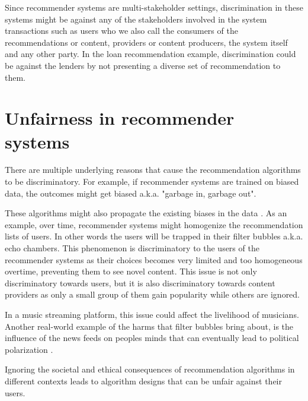 Since recommender systems are multi-stakeholder settings, discrimination in these systems might be against any of the stakeholders involved in the system transactions such as users who we also call the consumers of the recommendations or content, providers or content producers, the system itself and any other party. In the loan recommendation example, discrimination could be against the lenders by not presenting a diverse set of recommendation to them.


\section{Unfairness in recommender systems}

There are multiple underlying reasons that cause the recommendation algorithms to be discriminatory. For example, if recommender systems are trained on biased data, the outcomes might get biased a.k.a. "garbage in, garbage out". 

These algorithms might also propagate the existing biases in the data \cite{barocas2016big}. As an example, over time, recommender systems might homogenize the recommendation lists of users. In other words the users will be trapped in their filter bubbles a.k.a. echo chambers. This phenomenon is discriminatory to the users of the recommender systems as their choices becomes very limited and too homogeneous overtime, preventing them to see novel content. This issue is not only discriminatory towards users, but it is also discriminatory towards content providers as only a small group of them gain popularity while others are ignored.

In a music streaming platform, this issue could affect the livelihood of musicians. Another real-world example of the harms that filter bubbles bring about, is the influence of the news feeds on peoples minds that can eventually lead to political polarization \cite{HONG2016777}.  


Ignoring the societal and ethical consequences of recommendation algorithms in different contexts leads to algorithm designs that can be unfair against their users.



